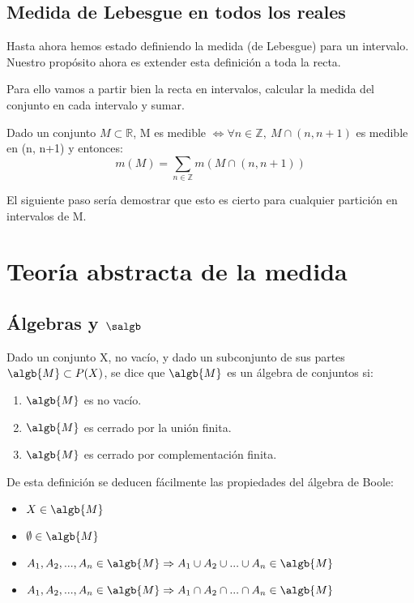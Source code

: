 \documentclass{apuntes}
\begin{document}
\section{Medida de Lebesgue en todos los reales}
Hasta ahora hemos estado definiendo la medida (de Lebesgue) para un intervalo. Nuestro propósito ahora es extender esta definición a toda la recta.

Para ello vamos a partir bien la recta en intervalos, calcular la medida del conjunto en cada intervalo y sumar.

Dado un conjunto $M \subset \mathbb{R}$, M es medible $\Leftrightarrow \forall n \in \mathbb{Z}, \ M \cap(n, n+1)$ es medible en (n, n+1) y entonces:
\[m(M)= \sum_{n \in \mathbb{Z}}m(M \cap (n, n+1))\]

El siguiente paso sería demostrar que esto es cierto para cualquier partición en intervalos de M.


\chapter{Teoría abstracta de la medida}
\section{Álgebras y $\salgb$}
\begin{defn}
Dado un conjunto X, no vacío, y dado un subconjunto de sus partes $\algb{M} \subset P(X)$, se dice que $\algb{M}$ es un álgebra de conjuntos si:
\begin{enumerate}
\item $\algb{M}$ es no vacío.
\item $\algb{M}$ es cerrado por la unión finita.
\item $\algb{M}$ es cerrado por complementación finita.
\end{enumerate}
\end{defn}

De esta definición se deducen fácilmente las propiedades del álgebra de Boole:
\begin{itemize}
\item $X \in \algb{M}$
\item $\emptyset \in \algb{M}$
\item $A_1, A_2,...,A_n \in \algb{M} \Rightarrow A_1 \cup A_2 \cup ... \cup A_n \in \algb{M}$
\item $A_1, A_2,...,A_n \in \algb{M} \Rightarrow A_1 \cap A_2 \cap ... \cap A_n \in \algb{M}$
\end{itemize}
\end{document}

